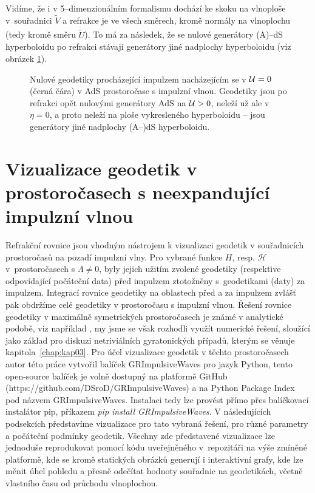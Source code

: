 Vidíme, že i v 5--dimenzionálním formalismu dochází ke skoku na vlnoploše v~souřadnici $\tilde{V}$ a refrakce je ve všech směrech, kromě normály na vlnoplochu (tedy kromě směru $\dot{\tilde{U}}$).
To má za následek, že se nulové generátory (A)--dS hyperboloidu po refrakci stávají generátory jiné nadplochy hyperboloidu (viz obrázek \ref{fig:jina_nadplocha}).

\begin{figure}[H]
    \centering
    \caption{Nulové geodetiky procházející impulzem nacházejícím se v $\mathcal{U}=0$ (černá čára) v AdS prostoročase s impulzní vlnou.
    Geodetiky jsou po refrakci opět nulovými generátory AdS na $\mathcal{U} > 0$, neleží už ale v $\eta = 0$, a proto
    neleží na ploše vykresleného hyperboloidu -- jsou generátory jiné nadplochy (A--)dS hyperboloidu.}
    \label{fig:jina_nadplocha}
\end{figure}

\section{Vizualizace geodetik v prostoročasech s neexpandující impulzní vlnou}
Refrakční rovnice jsou vhodným nástrojem k vizualizaci geodetik v souřadnicích prostoročasů na pozadí impulzní vlny.
Pro vybrané funkce $H$, resp. $\mathcal{H}$ v~prostoročasech s $\Lambda \neq 0$, byly jejich užitím zvolené geodetiky (respektive odpovídající počáteční data) před impulzem ztotožněny
s~geodetikami (daty) za impulzem. Integrací rovnice geodetiky na oblastech před a za impulzem zvlášť pak obdržíme celé geodetiky v prostoročasu s
impulzní vlnou. Řešení rovnice geodetiky v maximálně symetrických prostoročasech je známé v analytické podobě, viz například \cite{Podolsk__2001}, my jsme se však
rozhodli využít numerické řešení, sloužící jako základ pro diskuzi netriviálních gyratonických případů, kterým se věnuje kapitola~\ref{chap:kap03}.
Pro účel vizualizace geodetik v těchto prostoročasech autor této práce vytvořil balíček GRImpulsiveWaves pro jazyk Python,
tento open-source balíček je volně dostupný na platformě GitHub (https://github.com/DSroD/GRImpulsiveWaves) a na Python Package Index pod názvem
GRImpulsiveWaves. Instalaci tedy lze provést přímo přes balíčkovací instalátor pip, příkazem \textit{pip install GRImpulsiveWaves}. V následujících podsekcích
představíme vizualizace pro tato vybraná řešení, pro různé parametry a počáteční podmínky geodetik. Všechny zde představené vizualizace lze jednoduše reprodukovat
pomocí kódu uveřejněného v~repozitáři na výše zmíněné platformě, kde se kromě statických obrázků generují i interaktivní grafy, kde lze měnit úhel pohledu a přesně odečítat
hodnoty souřadnic na geodetikách, včetně vlastního času od průchodu vlnoplochou.

